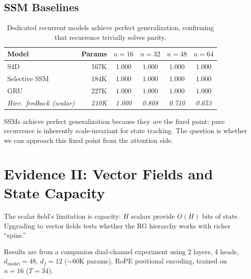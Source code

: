 \documentclass[11pt,a4paper]{article}
\begin{document}
\subsection{SSM Baselines}

\begin{table}[h]
\centering
\caption{Dedicated recurrent models achieve perfect generalization,
  confirming that recurrence trivially solves parity.}
\label{tab:ssm-results}
\begin{tabular}{@{}l rcccc@{}}
\toprule
Model & Params & $n{=}16$ & $n{=}32$ & $n{=}48$ & $n{=}64$ \\
\midrule
S4D              & 167K & $1.000$ & $1.000$ & $1.000$ & $1.000$ \\
Selective SSM    & 184K & $1.000$ & $1.000$ & $1.000$ & $1.000$ \\
GRU              & 227K & $1.000$ & $1.000$ & $1.000$ & $1.000$ \\
\midrule
\textit{Hier.\ feedback (scalar)} & \textit{210K} & \textit{1.000} & \textit{0.808} & \textit{0.710} & \textit{0.653} \\
\bottomrule
\end{tabular}
\end{table}

SSMs achieve perfect generalization because they \emph{are} the fixed
point: pure recurrence is inherently scale-invariant for state
tracking.  The question is whether we can approach this fixed point
from the attention side.


\section{Evidence II: Vector Fields and State Capacity}
\label{sec:vector-results}

The scalar field's limitation is capacity: $H$ scalars provide
$O(H)$ bits of state.  Upgrading to vector fields tests whether the
RG hierarchy works with richer ``spins.''

Results are from a companion dual-channel experiment using 2 layers,
4 heads, $d_{\mathrm{model}} = 48$, $d_f = 12$ ($\sim$60K params),
RoPE positional encoding, trained on $n = 16$ ($T = 34$).
\end{document}
